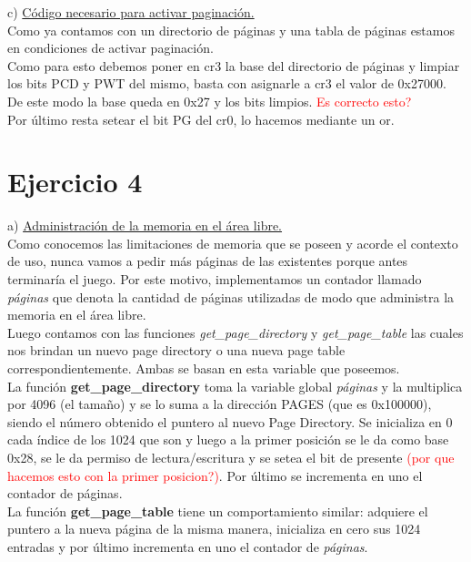 \documentclass[a4paper]{article}
\begin{document}
{\large c)} \underline{C\'odigo necesario para activar paginaci\'on.}\\

Como ya contamos con un directorio de p\'aginas y una tabla de p\'aginas estamos en condiciones de activar paginaci\'on.\\


Como para esto debemos poner en cr3 la base del directorio de p\'aginas y limpiar los bits PCD y PWT del mismo, basta con asignarle a cr3 el valor de 0x27000. De este modo la base queda en 0x27 y los bits limpios. \textcolor{red}{Es correcto esto?}\\

Por \'ultimo resta setear el bit PG del cr0, lo hacemos mediante un or.

\newpage
\section{Ejercicio 4}
{\large a)} \underline{Administraci\'on de la memoria en el \'area libre.}\\

Como conocemos las limitaciones de memoria que se poseen y acorde el contexto de uso, nunca vamos a pedir m\'as p\'aginas de las existentes porque antes terminar\'ia el juego. Por este motivo, implementamos un contador llamado \textit{p\'aginas} que denota la cantidad de p\'aginas utilizadas de modo que administra la memoria en el \'area libre.\\

Luego contamos con las funciones \textit{get_page_directory} y \textit{get_page_table} las cuales nos brindan un nuevo page directory o una nueva page table correspondientemente. Ambas se basan en esta variable que poseemos. \\

La funci\'on \textbf{get_page_directory} toma la variable global \textit{p\'aginas} y la multiplica por 4096 (el tama\~no) y se lo suma a la direcci\'on PAGES (que es 0x100000), siendo el n\'umero obtenido el puntero al nuevo Page Directory. Se inicializa en 0 cada \'indice de los 1024 que son y luego a la primer posici\'on se le da como base 0x28, se le da permiso de lectura/escritura y se setea el bit de presente \textcolor{red}{(por que hacemos esto con la primer posicion?)}. Por \'ultimo se incrementa en uno el contador de p\'aginas.\\

La funci\'on \textbf{get_page_table} tiene un comportamiento similar: adquiere el puntero a la nueva p\'agina de la misma manera, inicializa en cero sus 1024 entradas y por \'ultimo incrementa en uno el contador de \textit{p\'aginas}.\\
\end{document}
